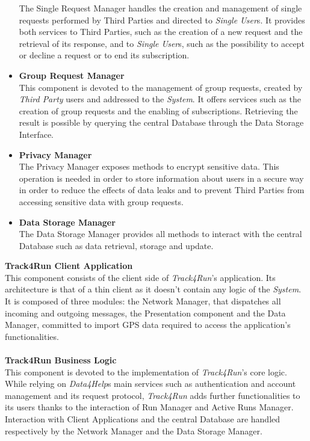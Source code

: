 \documentclass[titlepage]{article}
\begin{document}
\begin{itemize}
		The Single Request Manager handles the creation and management of single requests performed by Third Parties and directed to {\it Single User}s. It provides both services to Third Parties, such as the creation of a new request and the retrieval of its response, and to {\it Single User}s, such as the possibility to accept or decline a request or to end its subscription.
		\item {\bf Group Request Manager }\\
		This component is devoted to the management of group requests, created by {\it Third Party} users and addressed to the {\it System}. It offers services such as the creation of group requests and the enabling of subscriptions. Retrieving the result is possible by querying the central Database through the Data Storage Interface.
		\item {\bf Privacy Manager }\\
		The Privacy Manager exposes methods to encrypt sensitive data. This operation is needed in order to store information about users in a secure way in order to reduce the effects of data leaks and to prevent Third Parties from accessing sensitive data with group requests. 
		\item {\bf Data Storage Manager }\\
		The Data Storage Manager provides all methods to interact with the central Database such as data retrieval, storage and update.
    \end{itemize}    
{\bf Track4Run Client Application }\\ 
This component consists of the client side of {\it Track4Run}’s application. Its architecture is that of a thin client as it doesn’t contain any logic of the {\it System}. It is composed of three modules: the Network Manager, that dispatches all incoming and outgoing messages, the Presentation component and the Data Manager, committed to import GPS data required to access the application’s functionalities. \\ \\
{\bf Track4Run Business Logic }\\ 
This component is devoted to the implementation of {\it Track4Run}’s core logic. While relying on {\it Data4Help}s main services such as authentication and account management and its request protocol, {\it Track4Run} adds further functionalities to its users thanks to the interaction of Run Manager and Active Runs Manager. 
Interaction with Client Applications and the central Database are handled respectively by the Network Manager and the Data Storage Manager.
\end{document}
